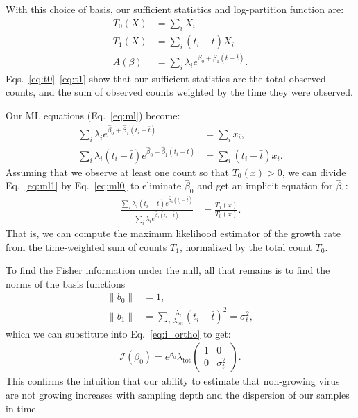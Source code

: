 \documentclass[12pt, letterpaper]{article}
\newcommand{ \lambtot }{\lambda_{\text{tot}}}
\begin{document}
With this choice of basis, our sufficient statistics and log-partition function are:
\begin{align}
    T_0(X) &= \sum_i X_i \label{eq:t0} \\
    T_1(X) &= \sum_i (t_i - \bar{t}) X_i \label{eq:t1} \\
    A(\beta) &= \sum_i \lambda_i e^{\beta_0 + \beta_1 (t - \bar{t})}.
\end{align}
Eqs.~\ref{eq:t0}--\ref{eq:t1} show that our sufficient statistics are the total observed counts, and the sum of observed counts weighted by the time they were observed.

Our ML equations (Eq.~\ref{eq:ml}) become:
\begin{align}
    \sum_i \lambda_i e^{\hat{\beta}_0 + \hat{\beta}_1 (t_i - \bar{t})} &= \sum_i x_i, \label{eq:ml0} \\
    \sum_i \lambda_i (t_i - \bar{t}) e^{\hat{\beta}_0 + \hat{\beta}_1 (t_i - \bar{t})} &= \sum_i (t_i - \bar{t}) x_i. \label{eq:ml1}
\end{align}
Assuming that we observe at least one count so that $T_0(x) > 0$, we can divide Eq.~\ref{eq:ml1} by Eq.~\ref{eq:ml0} to eliminate $\hat{\beta}_0$ and get an implicit equation for $\hat{\beta}_1$:
\begin{align}
    \frac{\sum_i \lambda_i (t_i - \bar{t}) e^{\hat{\beta}_1 (t_i - \bar{t})}}{\sum_i \lambda_i e^{\hat{\beta}_1 (t_i - \bar{t})}}
    &= \frac{T_1(x)}{T_0(x)}.
\end{align}
That is, we can compute the maximum likelihood estimator of the growth rate from the time-weighted sum of counts $T_1$, normalized by the total count $T_0$.

To find the Fisher information under the null, all that remains is to find the norms of the basis functions
\begin{align}
    \|b_0\| &= 1, \\
    \|b_1\| &= \sum_i \frac{\lambda_i}{\lambtot} {(t_i - \bar{t})}^2 = \sigma_t^2,
\end{align}
which  we can substitute into Eq.~\ref{eq:i_ortho} to get:
\begin{align}
    \mathcal{I}(\beta_0) = e^{\beta_0} \lambtot
    \begin{pmatrix}
        1 & 0 \\
        0 & \sigma_t^2
    \end{pmatrix}.
\end{align}
This confirms the intuition that our ability to estimate that non-growing virus are not growing increases with sampling depth and the dispersion of our samples in time.
\end{document}
